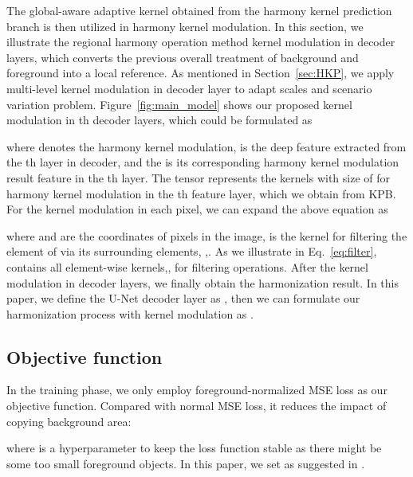 \documentclass[10pt,twocolumn,letterpaper]{article}
\begin{document}
The global-aware adaptive kernel obtained from the harmony kernel prediction branch is then utilized in harmony kernel modulation. In this section, we illustrate the regional harmony operation method kernel modulation in decoder layers, which converts the previous overall treatment of background and foreground into a local reference. As mentioned in Section~\ref{sec:HKP}, we apply multi-level kernel modulation in decoder layer to adapt scales and scenario variation problem. Figure~\ref{fig:main_model} shows our proposed kernel modulation in th decoder layers, which could be formulated as

where  denotes the harmony kernel modulation,  is the deep feature extracted from the th layer in decoder, and the  is its corresponding harmony kernel modulation result feature in the th layer. The tensor  represents the kernels with size of  for harmony kernel modulation in the th feature layer, which we obtain from KPB. For the kernel modulation in each pixel, we can expand the above equation as

where  and  are the coordinates of pixels in the image,  is the kernel for filtering the element  of  via its surrounding elements, \ie,. As we illustrate in Eq.~\ref{eq:filter},  contains all element-wise kernels,\ie,  for filtering operations. After the kernel modulation in decoder layers, we finally obtain the harmonization result. In this paper, we define the U-Net decoder layer as , then we can formulate our harmonization process with kernel modulation as 
.

\subsection{Objective function}
In the training phase, we only employ foreground-normalized MSE loss as our objective function. Compared with normal MSE loss, it reduces the impact of copying background area:

where  is a hyperparameter to keep the loss function stable as there might be some too small foreground objects. In this paper, we set  as suggested in \cite{Sofiiuk_2021_WACV}.
\end{document}
